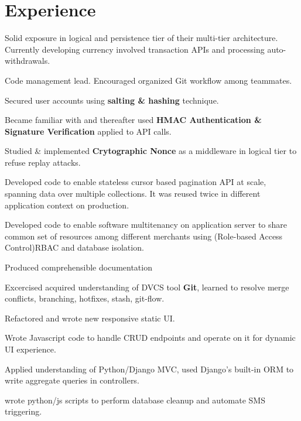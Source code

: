 \documentclass[]{deedy-resume-openfont}
\begin{document}
\begin{minipage}[t]{0.66\textwidth}


\section{Experience}

\vspace{\topsep} %
\begin{tightemize}
\item  Solid exposure in logical and persistence tier of their multi-tier architecture. Currently developing
  currency involved transaction APIs and processing auto-withdrawals.
\item Code management lead. Encouraged organized Git workflow among teammates.
\item Secured user accounts using \textbf{salting \& hashing} technique.
\item Became familiar with and thereafter used \textbf{HMAC Authentication \& Signature Verification} applied to API calls.
\item Studied \& implemented \textbf{Crytographic Nonce} as a middleware in logical tier to refuse replay attacks.
\item Developed code to enable stateless cursor based pagination API at scale, spanning data over multiple
  collections. It was reused twice in different application context on production.
\item Developed code to enable software multitenancy on application server to share common set of resources among
  different merchants using (Role-based Access Control)RBAC and database isolation.
\item Produced comprehensible documentation
\end{tightemize}
\sectionsep

\vspace{\topsep} %
\begin{tightemize}
\item  Excercised acquired understanding of DVCS tool \textbf{Git}, learned to resolve merge conflicts, branching,
  hotfixes, stash, git-flow.
\item Refactored and wrote new responsive static UI.
\item Wrote Javascript code to handle CRUD endpoints and operate on it for dynamic UI experience.
\item Applied understanding of Python/Django MVC, used Django's built-in ORM to
  write aggregate queries in controllers.
\item wrote python/js scripts to perform database cleanup and automate SMS triggering.
\end{tightemize}
\sectionsep


\end{minipage}
\end{document}
